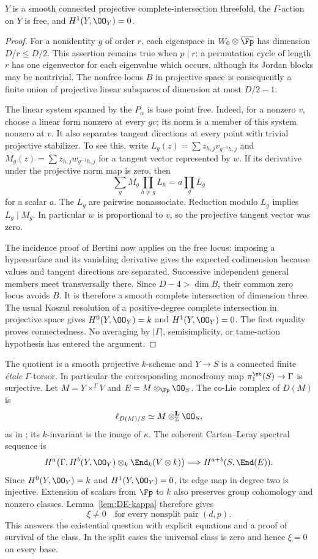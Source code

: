 \begin{lemma}\label{lem:DE-free-ci}
$Y$ is a smooth connected projective complete-intersection threefold, the $\Gamma$-action on $Y$ is free, and $H^1(Y,\OO_Y)=0$.
\end{lemma}
\begin{proof}
For a nonidentity $g$ of order $r$, each eigenspace in $W_0\otimes\overline{\Fp}$ has dimension $D/r\leq D/2$.  This assertion remains true when $p\mid r$: a permutation cycle of length $r$ has one eigenvector for each eigenvalue which occurs, although its Jordan blocks may be nontrivial.  The nonfree locus $B$ in projective space is consequently a finite union of projective linear subspaces of dimension at most $D/2-1$.

The linear system spanned by the $P_\alpha$ is base point free.  Indeed, for a nonzero $v$, choose a linear form nonzero at every $gv$; its norm is a member of this system nonzero at $v$.  It also separates tangent directions at every point with trivial projective stabilizer.  To see this, write $L_g(z)=\sum z_{h,j}v_{g^{-1}h,j}$ and $M_g(z)=\sum z_{h,j}w_{g^{-1}h,j}$ for a tangent vector represented by $w$.  If its derivative under the projective norm map is zero, then
\[
 \sum_g M_g\prod_{h\ne g}L_h=a\prod_gL_g
\]
for a scalar $a$.  The $L_g$ are pairwise nonassociate.  Reduction modulo $L_g$ implies $L_g\mid M_g$.  In particular $w$ is proportional to $v$, so the projective tangent vector was zero.

The incidence proof of Bertini now applies on the free locus: imposing a hypersurface and its vanishing derivative gives the expected codimension because values and tangent directions are separated.  Successive independent general members meet transversally there.  Since $D-4>\dim B$, their common zero locus avoids $B$.  It is therefore a smooth complete intersection of dimension three.  The usual Koszul resolution of a positive-degree complete intersection in projective space gives $H^0(Y,\OO_Y)=k$ and $H^1(Y,\OO_Y)=0$.  The first equality proves connectedness.  No averaging by $|\Gamma|$, semisimplicity, or tame-action hypothesis has entered the argument.
\end{proof}

The quotient is a smooth projective $k$-scheme and $Y\to S$ is a connected finite \emph{\'etale} $\Gamma$-torsor.  In particular the corresponding monodromy map $\pi_1^{\et}(S)\to\Gamma$ is surjective.  Let $M=Y\times^\Gamma V$ and $E=M\otimes_{\Fp}\OO_S$.  The co-Lie complex of $D(M)$ is
\[
 \ell_{D(M)/S}\simeq M\otimes^{\mathbf L}_{\mathbb Z}\OO_S,
\]
as in \cite[Proposition~B.4]{BerghRydh2019}; its $k$-invariant is the image of $\kappa$.  The coherent Cartan--Leray spectral sequence is
\[
 H^a\bigl(\Gamma,H^b(Y,\OO_Y)\otimes_k\End_k(V\otimes k)\bigr)
       \Longrightarrow H^{a+b}(S,\End(E)).
\]
Since $H^0(Y,\OO_Y)=k$ and $H^1(Y,\OO_Y)=0$, its edge map in degree two is injective.  Extension of scalars from $\Fp$ to $k$ also preserves group cohomology and nonzero classes.  Lemma~\ref{lem:DE-kappa} therefore gives
\[
 \xi\ne0\quad\text{for every nonsplit pair }(d,p).
\]
This answers the existential question with explicit equations and a proof of survival of the class.  In the split cases the universal class is zero and hence $\xi=0$ on every base.

